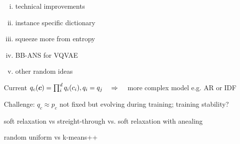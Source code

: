 \documentclass[smaller]{beamer}
\begin{document}
\begin{frame}[t]


\vskip 0.5cm

\begin{enumerate}[i)]
\item technical improvements
\item instance specific dictionary
\item squeeze more from entropy
\item BB-ANS for VQVAE
\item other random ideas
\end{enumerate}


\end{frame}



\begin{frame}[t]

\vskip 0.5cm

\emph{}
\vskip 0.3cm

{\scriptsize
Current $q_c({\bm{c}}) = \prod_i^d q_i(c_i), q_i = q_j \quad \Rightarrow \quad$ \alert{more complex model e.g. AR or IDF}
\vskip 0.3cm

Challenge: $q_c \approx p_c$ not fixed but evolving during training; training stability?
}
\vskip 0.5cm

\emph{}
\vskip 0.3cm

{\scriptsize
soft relaxation vs streight-through vs. soft relaxation with anealing
}
\vskip 0.5cm

\emph{}
\vskip 0.3cm

{\scriptsize
random uniform vs k-means++
}

\end{frame}


\end{document}
